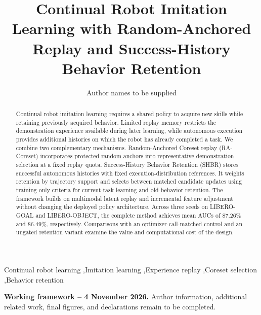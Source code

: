 \documentclass[review,12pt]{elsarticle}
\begin{document}
\begin{frontmatter}
\title{Continual Robot Imitation Learning with Random-Anchored Replay
and Success-History Behavior Retention}
\author{Author names to be supplied}
\begin{abstract}
Continual robot imitation learning requires a shared policy to acquire new
skills while retaining previously acquired behavior. Limited replay memory
restricts the demonstration experience available during later learning,
while autonomous execution provides additional histories on which the robot
has already completed a task. We combine two complementary mechanisms.
Random-Anchored Coreset replay (RA-Coreset) incorporates protected random
anchors into representative demonstration selection at a fixed replay quota.
Success-History Behavior Retention (SHBR) stores successful autonomous
histories with fixed execution-distribution references. It weights retention
by trajectory support and selects between matched candidate updates using
training-only criteria for current-task learning and old-behavior retention.
The framework builds on multimodal latent replay and incremental feature
adjustment without changing the deployed policy architecture. Across three
seeds on LIBERO-GOAL and LIBERO-OBJECT, the complete method achieves mean
AUCs of 87.26\% and 86.49\%, respectively. Comparisons with an
optimizer-call-matched control and an ungated retention variant examine
the value and computational cost of the design.
\end{abstract}
\begin{keyword}
Continual robot learning \sep Imitation learning \sep Experience replay
\sep Coreset selection \sep Behavior retention
\end{keyword}
\end{frontmatter}
\noindent\textbf{Working framework -- 4 November 2026.}
Author information, additional related work, final figures, and declarations
remain to be completed.








\appendix



\end{document}
